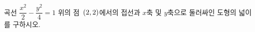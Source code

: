 곡선 $\dfrac{x^2}{2}-\dfrac{y^2}{4}=1$ 위의 점~$(2{,}\mkern3mu\mathopen{}2)$에서의 접선과 $x$축 및 \mbox{$y$축}으로 둘러싸인 도형의 넓이를 구하시오.
